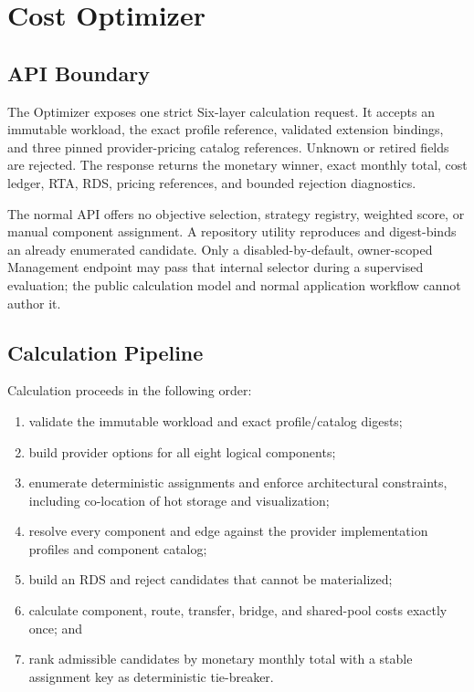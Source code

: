 \section{Cost Optimizer}
\label{sec:optimizer}

\subsection{API Boundary}
\label{sec:optimizer-api}

The Optimizer exposes one strict Six-layer calculation request. It accepts an
immutable workload, the exact profile reference, validated extension bindings,
and three pinned provider-pricing catalog references. Unknown or retired fields
are rejected. The response returns the monetary winner, exact monthly total,
cost ledger, RTA, RDS, pricing references, and bounded rejection diagnostics.

The normal API offers no objective selection, strategy registry, weighted
score, or manual component assignment. A repository utility reproduces and
digest-binds an already enumerated candidate. Only a disabled-by-default,
owner-scoped Management endpoint may pass that internal selector during a
supervised evaluation; the public calculation model and normal application
workflow cannot author it.

\subsection{Calculation Pipeline}
\label{sec:calc-pipeline}

Calculation proceeds in the following order:

\begin{enumerate}
    \item validate the immutable workload and exact profile/catalog digests;
    \item build provider options for all eight logical components;
    \item enumerate deterministic assignments and enforce architectural
    constraints, including co-location of hot storage and visualization;
    \item resolve every component and edge against the provider implementation
    profiles and component catalog;
    \item build an RDS and reject candidates that cannot be materialized;
    \item calculate component, route, transfer, bridge, and shared-pool costs
    exactly once; and
    \item rank admissible candidates by monetary monthly total with a stable
    assignment key as deterministic tie-breaker.
\end{enumerate}

